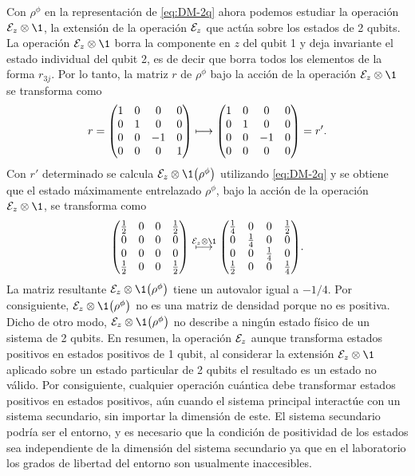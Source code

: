 Con $\rho^{\phi}$ en la representación de \eqref{eq:DM-2q} ahora
podemos estudiar la operación $\E_z\otimes\1$, la extensión 
de la operación $\mathcal{E}_z$ que actúa sobre los estados de 2 qubits. 
La operación $\E_z\otimes\1$ borra la componente en $z$ del 
qubit 1 y deja invariante el estado individual del qubit 2, 
es de decir que borra todos los elementos de la forma $r_{3j}$.
Por lo tanto, la matriz $r$ de $\rho^{\phi}$ bajo la acción de la 
operación $\E_z\otimes\1$ se transforma como
\begin{align}
r=
\mqty(
1&0&0&0\\
0&1&0&0\\
0&0&-1&0\\
0&0&0&1
)
\longmapsto
\mqty(
1&0&0&0\\
0&1&0&0\\
0&0&-1&0\\
0&0&0&0
)
=r'.
\end{align}
Con $r'$ determinado se calcula $\E_z\otimes\1\qty(\rho^{\phi})$ 
utilizando \eqref{eq:DM-2q} y se obtiene que el estado 
máximamente entrelazado $\rho^{\phi}$, bajo la acción de la
operación $\E_z\otimes\1$, se transforma como
\begin{align}
\mqty( 
\frac{1}{2} & 0 & 0 & \frac{1}{2} \\
0 & 0 & 0 & 0 \\
0 & 0 & 0 & 0 \\
\frac{1}{2} & 0 & 0 & \frac{1}{2} \\
)
\stackrel{\E_{z}\otimes\1}{\longmapsto}
\mqty( 
\frac{1}{4} & 0 & 0 & \frac{1}{2} \\
0 & \frac{1}{4} & 0 & 0 \\
0 & 0 & \frac{1}{4} & 0 \\
\frac{1}{2} & 0 & 0 & \frac{1}{4} \\
).
\end{align}
La matriz resultante $\E_z\otimes\1\qty(\rho^{\phi})$ tiene un 
autovalor igual a $-1/4$.
Por consiguiente, $\E_z\otimes\1\qty(\rho^{\phi})$ no es una matriz 
de densidad porque no es positiva.  
Dicho de otro modo, $\E_z\otimes\1\qty(\rho^{\phi})$ 
no describe a ningún estado físico de un sistema de 2 qubits.
En resumen, la operación $\mathcal{E}_z$ aunque transforma estados positivos
en estados positivos de 1 qubit, al considerar la extensión $\E_z\otimes\1$
aplicado sobre un estado particular de 2 qubits el resultado es un 
estado no válido. Por consiguiente, cualquier operación cuántica 
debe transformar estados positivos en estados positivos,
aún cuando el sistema principal interactúe con un sistema secundario,
sin importar la dimensión de este. El sistema secundario podría ser
el entorno, y es necesario que la condición de positividad de los estados
sea independiente de la dimensión del sistema secundario ya que 
en el laboratorio los grados de libertad del entorno son usualmente inaccesibles.

